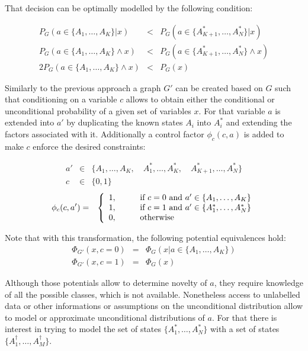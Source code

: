 That decision can be optimally modelled by the following condition:

\begin{eqnarray*}
P_G(a \in \{A_1,\dotsc, A_K\}|x) &<& P_G(a \in \{A^*_{K+1},\dotsc,A^*_N\}|x) \\
P_G(a \in \{A_1,\dotsc, A_K\} \land x) &<& P_G(a \in \{A^*_{K+1},\dotsc,A^*_N\} \land x) \\
2 P_G(a \in \{A_1,\dotsc, A_K\} \land x) &<& P_G(x)
\end{eqnarray*}

Similarly to the previous approach a graph $G'$ can be created based on $G$ such
that conditioning on a variable $c$ allows to obtain either the conditional or
unconditional probability of a given set of variables $x$.
For that variable $a$ is extended into $a'$ by duplicating the known states $A_i$
into $A^*_i$ and extending the factors associated with it.
Additionally a control factor $\phi_c(c, a)$ is added to make $c$ enforce the
desired constraints:

\begin{eqnarray*}
a' &\in& \{A_1, \dotsc, A_K,\quad A^*_1, \dots, A^*_K,\quad A^*_{K+1}, \dots, A^*_N\} \\
c &\in& \{0, 1\}
\end{eqnarray*}
\begin{eqnarray*}
\phi_c(c, a') &=& \left\{
  \begin{array}{l l}
    1, & \qquad \text{if } c = 0 \text{ and } a' \in \{A_1,\dotsc,A_K\} \\
    1, & \qquad \text{if } c = 1 \text{ and } a' \in \{A^*_1,\dotsc,A^*_N\}\\
    0, & \qquad \text{otherwise}
  \end{array} \right. \\
\end{eqnarray*}

Note that with this transformation, the following potential equivalences hold:
\begin{eqnarray*}
\Phi_{G'}(x, c=0) &=& \Phi_{G}(x | a \in \{A_1, \dots, A_K\})\\
\Phi_{G'}(x, c=1) &=& \Phi_{G}(x) 
\end{eqnarray*}


Although those potentials allow to determine novelty of $a$, they require
knowledge of all the possible classes, which is not available.
Nonetheless access to unlabelled data or other informations or assumptions on
the unconditional distribution allow to model or approximate unconditional
distributions of $a$. For that there is interest in trying to model the set
of states $\{A^*_1, \dots, A^*_N\}$ with a set of states $\{A^{\dag}_1, \dotsc, A^{\dag}_M\}$.

